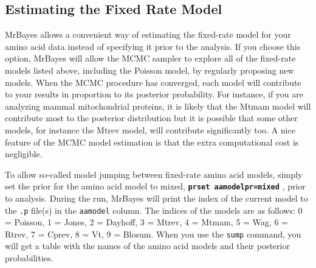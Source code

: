 \documentclass[12pt]{book}
\newcommand{\ttt}[1]{\texttt{#1} }
\newcommand{\tb}[1]{\texttt{\textbf{#1}} }
\begin{document}
\subsection{Estimating the Fixed Rate Model}
MrBayes allows a convenient way of estimating the fixed-rate model for your amino acid data instead
of specifying it prior to the analysis. If you choose this option, MrBayes will allow the MCMC
sampler to explore all of the fixed-rate models listed above, including the Poisson model, by
regularly proposing new models. When the MCMC procedure has converged, each model will contribute
to your results in proportion to its posterior probability. For instance, if you are analyzing
mammal mitochondrial proteins, it is likely that the Mtmam model will contribute most to the
posterior distribution but it is possible that some other models, for instance the Mtrev model,
will contribute significantly too. A nice feature of the MCMC model estimation is that the extra
computational cost is negligible.

To allow so-called model jumping between fixed-rate amino acid models, simply set the prior for the
amino acid model to mixed, \tb{prset aamodelpr=mixed}, prior to analysis. During the run, MrBayes
will print the index of the current model to the \ttt{.p} file(s) in the \ttt{aamodel} column. The
indices of the models are as follows: 0 = Poisson, 1 = Jones, 2 = Dayhoff, 3 = Mtrev, 4 = Mtmam, 5
= Wag, 6 = Rtrev, 7 = Cprev, 8 = Vt, 9 = Blosum. When you use the \ttt{sump} command, you will get
a table with the names of the amino acid models and their posterior probabilities.
\end{document}
